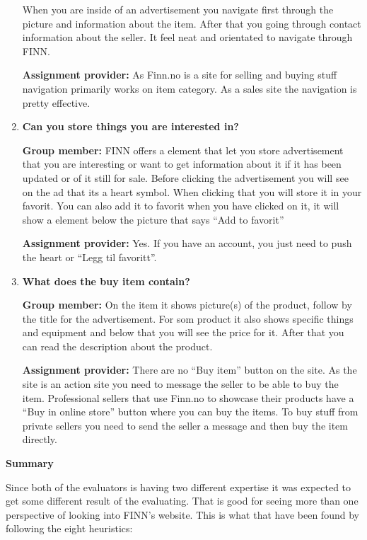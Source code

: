 \begin{enumerate}
When you are inside of an advertisement you navigate first through the picture and information about the item. After that you going through contact information about the seller. It feel neat and orientated to navigate through FINN.

\textbf{Assignment provider:}
As Finn.no is a site for selling and buying stuff navigation primarily works on item category. As a sales site the navigation is pretty effective.

    \item \textbf{Can you store things you are interested in?}

\textbf{Group member:} 
FINN offers a element that let you store advertisement that you are interesting or want to get information about it if it has been updated or of it still for sale. Before clicking the advertisement you will see on the ad that its a heart symbol. When clicking that you will store it in your favorit. You can also add it to favorit when you have clicked on it, it will show a element below the picture that says “Add to favorit”

\textbf{Assignment provider:}
Yes. If you have an account, you just need to push the heart or “Legg til favoritt”.
	
    \item \textbf{What does the buy item contain?}

\textbf{Group member:} 
On the item it shows picture(s) of the product, follow by the title for the advertisement. For som product it also shows specific things and equipment and below that you will see the price for it. After that you can read the description about the product.

\textbf{Assignment provider:}
There are no “Buy item” button on the site. As the site is an action site you need to message the seller to be able to buy the item. Professional sellers that use Finn.no to showcase their products have a “Buy in online store” button where you can buy the items. To buy stuff from private sellers you need to send the seller a message and then buy the item directly.
\end{enumerate}

\textbf{Summary}

Since both of the evaluators is having two different expertise it was expected to get some different result of the evaluating. That is good for seeing more than one perspective of looking into FINN’s website. This is what that have been found by following the eight heuristics: 

